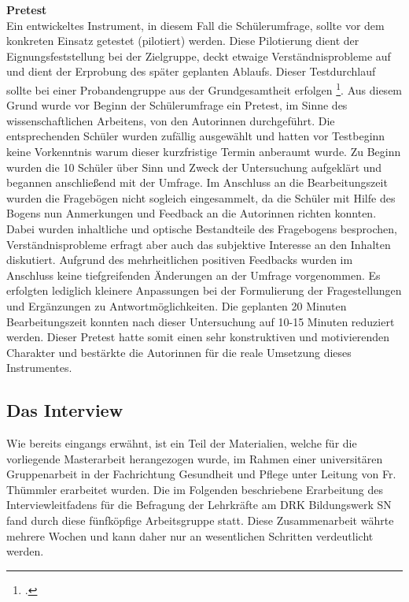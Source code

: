 \noindent
\textbf{Pretest}\\

\noindent
Ein entwickeltes Instrument, in diesem Fall die Schülerumfrage, sollte vor dem konkreten Einsatz getestet (pilotiert) werden. Diese Pilotierung dient der Eignungsfeststellung bei der Zielgruppe, deckt etwaige Verständnisprobleme auf und dient der Erprobung des später geplanten Ablaufs. Dieser Testdurchlauf sollte bei einer Probandengruppe aus der Grundgesamtheit erfolgen \footcite[vgl.][275]{Krueger2014}. Aus diesem Grund wurde vor Beginn der Schülerumfrage ein Pretest, im  Sinne des wissenschaftlichen Arbeitens, von den Autorinnen durchgeführt. Die entsprechenden Schüler wurden zufällig ausgewählt und hatten vor Testbeginn keine Vorkenntnis warum dieser kurzfristige Termin anberaumt wurde. Zu Beginn wurden die 10 Schüler über Sinn und Zweck der Untersuchung aufgeklärt und begannen anschließend mit der Umfrage. Im Anschluss an die Bearbeitungszeit wurden die Fragebögen nicht sogleich eingesammelt, da die Schüler mit Hilfe des Bogens nun Anmerkungen und Feedback an die Autorinnen richten konnten. Dabei wurden inhaltliche und optische Bestandteile des Fragebogens besprochen, Verständnisprobleme erfragt aber auch das subjektive Interesse an den Inhalten diskutiert. Aufgrund des mehrheitlichen positiven Feedbacks wurden im Anschluss keine tiefgreifenden Änderungen an der Umfrage vorgenommen. Es erfolgten lediglich kleinere Anpassungen bei der Formulierung der Fragestellungen und Ergänzungen zu Antwortmöglichkeiten. Die geplanten 20 Minuten Bearbeitungszeit konnten nach dieser Untersuchung auf 10-15 Minuten reduziert werden. Dieser Pretest hatte somit einen sehr konstruktiven und motivierenden Charakter und bestärkte die Autorinnen für die reale Umsetzung dieses Instrumentes.

\subsection{Das Interview}
\label{sec:DasInterview}

Wie bereits eingangs erwähnt, ist ein Teil der Materialien, welche für die vorliegende Masterarbeit herangezogen wurde, im Rahmen einer universitären Gruppenarbeit in der Fachrichtung Gesundheit und Pflege unter Leitung von Fr. Thümmler erarbeitet wurden. Die im Folgenden beschriebene Erarbeitung des Interviewleitfadens für die Befragung der Lehrkräfte am DRK Bildungswerk SN fand durch diese fünfköpfige Arbeitsgruppe statt. Diese Zusammenarbeit währte mehrere Wochen und kann daher nur an wesentlichen Schritten verdeutlicht werden.

